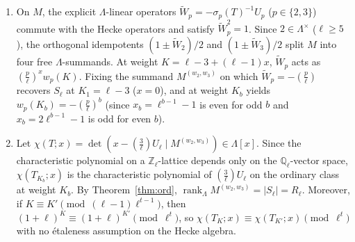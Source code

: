 \documentclass[11pt,reqno]{amsart}
\theoremstyle{definition}
\theoremstyle{remark}
\newcommand{\Z}{\mathbb{Z}}
\newcommand{\Q}{\mathbb{Q}}
\newcommand{\legendre}[2]{\left(\frac{#1}{#2}\right)}
\begin{document}
\begin{enumerate}
  \item On $M$, the explicit $\Lambda$-linear operators $\widetilde{W}_p = -\sigma_p(T)^{-1} U_p$ ($p \in \{2,3\}$) commute with the Hecke operators and satisfy $\widetilde{W}_p^2 = 1$. Since $2 \in \Lambda^\times$ ($\ell \ge 5$), the orthogonal idempotents $(1 \pm \widetilde{W}_2)/2$ and $(1 \pm \widetilde{W}_3)/2$ split $M$ into four free $\Lambda$-summands. At weight $K = \ell - 3 + (\ell-1)x$, $\widetilde{W}_p$ acts as $\legendre{p}{\ell}^x w_p(K)$. Fixing the summand $M^{(w_2,w_3)}$ on which $\widetilde{W}_p = -\legendre{p}{\ell}$ recovers $S_\ell$ at $K_1 = \ell - 3$ ($x=0$), and at weight $K_b$ yields $w_p(K_b) = -\legendre{p}{\ell}^b$ (since $x_b = \ell^{b-1} - 1$ is even for odd $b$ and $x_b = 2\ell^{b-1} - 1$ is odd for even $b$).
  \item Let $\chi(T; x) = \det(x - \legendre{3}{\ell} U_\ell \mid M^{(w_2,w_3)}) \in \Lambda[x]$. Since the characteristic polynomial on a $\Z_\ell$-lattice depends only on the $\Q_\ell$-vector space, $\chi(T_{K_b}; x)$ is the characteristic polynomial of $\legendre{3}{\ell} U_\ell$ on the ordinary class at weight $K_b$. By Theorem~\ref{thm:ord}, $\operatorname{rank}_\Lambda M^{(w_2,w_3)} = |S_\ell| = R_\ell$. Moreover, if $K \equiv K' \pmod{(\ell-1)\ell^{t-1}}$, then $(1+\ell)^K \equiv (1+\ell)^{K'} \pmod{\ell^t}$, so $\chi(T_K; x) \equiv \chi(T_{K'}; x) \pmod{\ell^t}$ with no \'etaleness assumption on the Hecke algebra.
\end{enumerate}
\end{document}
